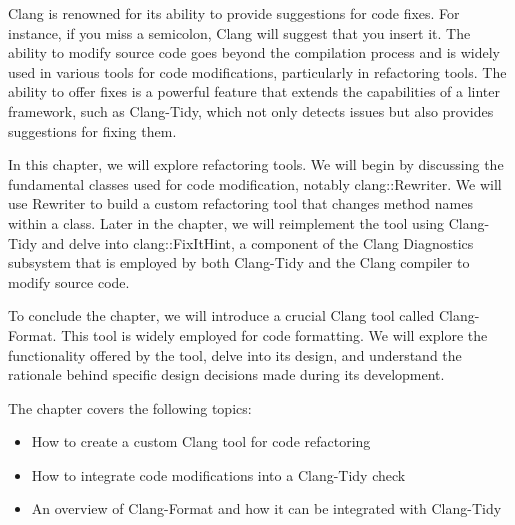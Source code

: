 
Clang is renowned for its ability to provide suggestions for code fixes. For instance, if you miss a semicolon, Clang will suggest that you insert it. The ability to modify source code goes beyond the compilation process and is widely used in various tools for code modifications, particularly in refactoring tools. The ability to offer fixes is a powerful feature that extends the capabilities of a linter framework, such as Clang-Tidy, which not only detects issues but also provides suggestions for fixing them.

In this chapter, we will explore refactoring tools. We will begin by discussing the fundamental classes used for code modification, notably clang::Rewriter. We will use Rewriter to build a custom refactoring tool that changes method names within a class. Later in the chapter, we will reimplement the tool using Clang-Tidy and delve into clang::FixItHint, a component of the Clang Diagnostics subsystem that is employed by both Clang-Tidy and the Clang compiler to modify source code.

To conclude the chapter, we will introduce a crucial Clang tool called Clang-Format. This tool is widely employed for code formatting. We will explore the functionality offered by the tool, delve into its design, and understand the rationale behind specific design decisions made during its development.

The chapter covers the following topics:

\begin{itemize}
\item
How to create a custom Clang tool for code refactoring

\item
How to integrate code modifications into a Clang-Tidy check

\item
An overview of Clang-Format and how it can be integrated with Clang-Tidy
\end{itemize}
















